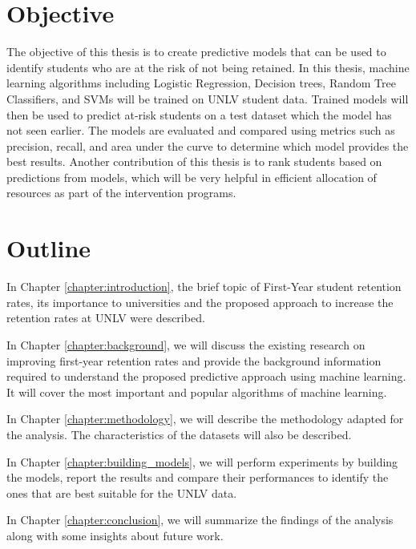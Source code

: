 \documentclass[11pt,openright]{report}
\begin{document}
\section{Objective}\label{section:objective}
The objective of this thesis is to create predictive models that can be used to identify students who are at the risk of not being retained. In this thesis, machine learning algorithms including Logistic Regression, Decision trees, Random Tree Classifiers, and SVMs will be trained on UNLV student data. Trained models will then be used to predict at-risk students on  a test dataset which the model has not seen earlier. The models are evaluated and compared using metrics such as precision, recall, and area under the curve to determine which model provides the best results. Another contribution of this thesis is to rank students based on predictions from models, which will be very helpful in efficient allocation of resources as part of the intervention programs.

\section{Outline}\label{section:outline}

In Chapter \ref{chapter:introduction}, the brief topic of First-Year student retention rates, its importance to universities and the proposed approach to increase the retention rates at UNLV were described.\newline

\noindent In Chapter \ref{chapter:background}, we will discuss the existing research on improving first-year retention rates and provide the background information required to understand the proposed predictive approach using machine learning. It will cover the most important and popular algorithms of machine learning.
\newline

\noindent In Chapter \ref{chapter:methodology}, we will describe the methodology adapted for the analysis. The characteristics of the datasets will also be described.
\newline

\noindent In Chapter \ref{chapter:building_models}, we will perform experiments by building the models, report the results and compare their performances to identify the ones that are best suitable for the UNLV data. \newline

\noindent In Chapter \ref{chapter:conclusion}, we will summarize the findings of the analysis along with some insights about future work.
\end{document}
